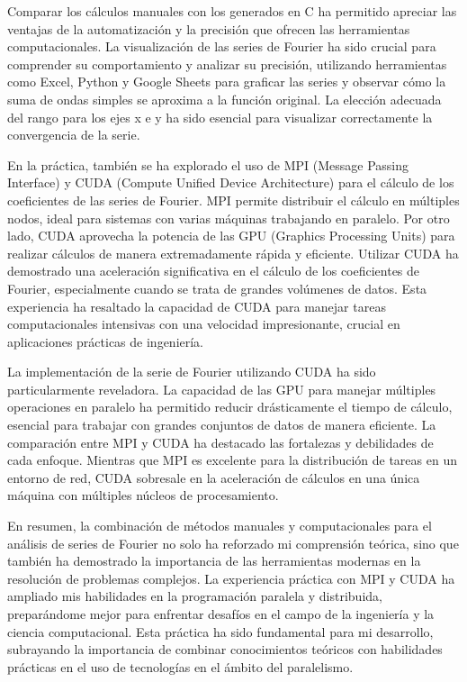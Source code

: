 Comparar los cálculos manuales con los generados en C ha permitido apreciar las ventajas de la automatización y la precisión que ofrecen las herramientas computacionales. La visualización de las series de Fourier ha sido crucial para comprender su comportamiento y analizar su precisión, utilizando herramientas como Excel, Python y Google Sheets para graficar las series y observar cómo la suma de ondas simples se aproxima a la función original. La elección adecuada del rango para los ejes x e y ha sido esencial para visualizar correctamente la convergencia de la serie.

En la práctica, también se ha explorado el uso de MPI (Message Passing Interface) y CUDA (Compute Unified Device Architecture) para el cálculo de los coeficientes de las series de Fourier. MPI permite distribuir el cálculo en múltiples nodos, ideal para sistemas con varias máquinas trabajando en paralelo. Por otro lado, CUDA aprovecha la potencia de las GPU (Graphics Processing Units) para realizar cálculos de manera extremadamente rápida y eficiente. Utilizar CUDA ha demostrado una aceleración significativa en el cálculo de los coeficientes de Fourier, especialmente cuando se trata de grandes volúmenes de datos. Esta experiencia ha resaltado la capacidad de CUDA para manejar tareas computacionales intensivas con una velocidad impresionante, crucial en aplicaciones prácticas de ingeniería.

La implementación de la serie de Fourier utilizando CUDA ha sido particularmente reveladora. La capacidad de las GPU para manejar múltiples operaciones en paralelo ha permitido reducir drásticamente el tiempo de cálculo, esencial para trabajar con grandes conjuntos de datos de manera eficiente. La comparación entre MPI y CUDA ha destacado las fortalezas y debilidades de cada enfoque. Mientras que MPI es excelente para la distribución de tareas en un entorno de red, CUDA sobresale en la aceleración de cálculos en una única máquina con múltiples núcleos de procesamiento.

En resumen, la combinación de métodos manuales y computacionales para el análisis de series de Fourier no solo ha reforzado mi comprensión teórica, sino que también ha demostrado la importancia de las herramientas modernas en la resolución de problemas complejos. La experiencia práctica con MPI y CUDA ha ampliado mis habilidades en la programación paralela y distribuida, preparándome mejor para enfrentar desafíos en el campo de la ingeniería y la ciencia computacional. Esta práctica ha sido fundamental para mi desarrollo, subrayando la importancia de combinar conocimientos teóricos con habilidades prácticas en el uso de tecnologías en el ámbito del paralelismo.
